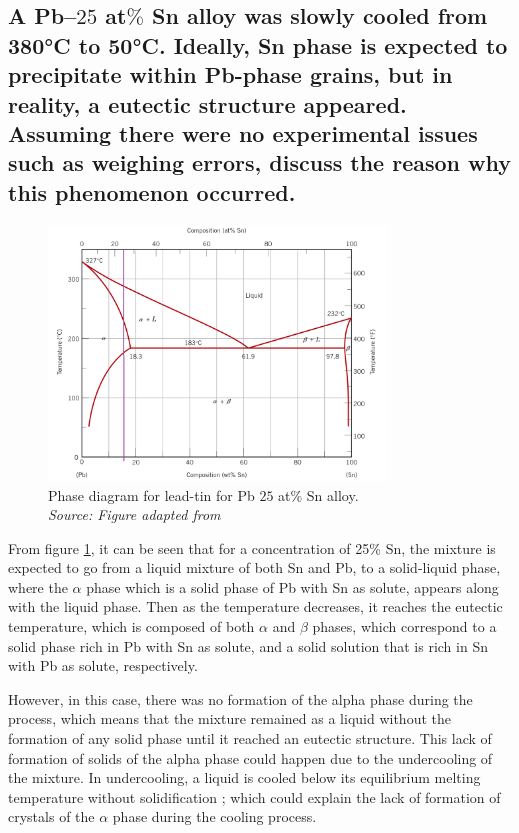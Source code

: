 \subsection{A Pb–$25$ at$\%$ Sn alloy was slowly cooled from 380°C to 50°C. Ideally, Sn phase is expected to precipitate within Pb-phase grains, but in reality, a eutectic structure appeared. Assuming there were no experimental issues such as weighing errors, discuss the reason why this phenomenon occurred.}

\begin{figure}[h]
    \centering
    \includegraphics[width=0.8\textwidth]{graficas/diagrama01.png}
    \caption{Phase diagram for lead-tin for Pb $25$ at\% Sn alloy.\\
    \textit{Source: Figure adapted from \citet[p.~300]{callister2010materials}}}
    \label{fig:diagrama01}
\end{figure}

From figure \ref{fig:diagrama01}, it can be seen that for a concentration of 25\% Sn, the mixture is expected to go from a liquid mixture of both Sn and Pb, to a solid-liquid phase, where the $\alpha$ phase which is a solid phase of Pb with Sn as solute, appears along with the liquid phase. Then as the temperature decreases, it reaches the eutectic temperature, which is composed of both $\alpha$ and $\beta$ phases, which correspond to a solid phase rich in Pb with Sn as solute, and a solid solution that is rich in Sn with Pb as solute, respectively. 

However, in this case, there was no formation of the alpha phase during the process, which means that the mixture remained as a liquid without the formation of any solid phase until it reached an eutectic structure. This lack of formation of solids of the alpha phase could happen due to the undercooling of the mixture. In undercooling, a liquid is cooled below its equilibrium melting temperature without solidification \citep[p.~189]{porter2009phase}; which could explain the lack of formation of crystals of the $\alpha$ phase during the cooling process. 

